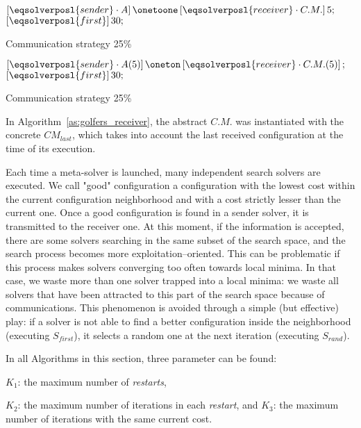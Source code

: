 \begin{algorithm}
\dontprintsemicolon
\SetNoline
$\left[\eqsolverposl{sender}\cdot A\right] \onetoone \left[\eqsolverposl{receiver}\cdot C.M.\right]5;$\;
$\left[\eqsolverposl{first}\right]30;$
\caption{Communication strategy \oneTone{} 25\%}\label{comm:golfers_1_1-1_25}
\end{algorithm}

\begin{algorithm}
\dontprintsemicolon
\SetNoline
$\left[\eqsolverposl{sender}\cdot A(5)\right] \oneton \left[\eqsolverposl{receiver}\cdot C.M.(5)\right];$\;
$\left[\eqsolverposl{first}\right]30;$
\caption{Communication strategy \oneTn{} 25\%}\label{comm:golfers_1_1-n_25}
\end{algorithm}

In Algorithm~\ref{as:golfers_receiver}, the abstract \opch{} $C.M.$ was instantiated with the concrete \opch{} $CM_{last}$, which takes into account the last received configuration at the time of its execution.

Each time a \posl{} meta-solver is launched, many independent search solvers are executed. We call "good" configuration a configuration with the lowest cost within the current configuration neighborhood and with a cost strictly lesser than the current one. Once a good configuration is found in a sender solver, it is transmitted to the receiver one. At this moment, if the information is accepted, there are some solvers searching in the same subset of the search space, and the search process becomes more exploitation--oriented. This can be problematic if this process makes solvers converging too often towards local minima. In that case, we waste more than one solver trapped into a local minima: we waste all solvers that have been attracted to this part of the search space because of communications. This phenomenon is avoided through a simple (but effective) play: if a solver is not able to find a better configuration inside the neighborhood (executing $S_{first}$), it selects a random one at the next iteration (executing $S_{rand}$).

In all Algorithms in this section, three parameter can be found:\begin{inparaenum}[1.] \item $K_1$: the maximum number of {\it restarts}, \item $K_2$: the maximum number of iterations in each \textit{restart}, and $K_3$: the maximum number of iterations with the same current cost. \item \end{inparaenum}

